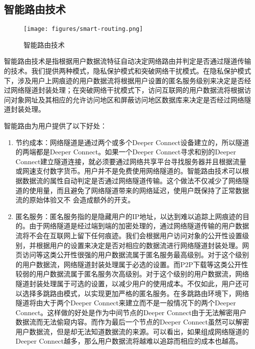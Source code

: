 \documentclass[a4paper]{article}
\begin{document}
\subsection{智能路由技术}

\begin{figure}[hhhh]
\centering
\texttt{[image: figures/smart-routing.png]}
\caption{智能路由技术}
\label{fig:smart-routing}
\end{figure}

智能路由技术是指根据用户数据流特征自动决定网络路由并判定是否通过隧道传输的技术。我们提供两种模式，隐私保护模式和突破网络干扰模式。在隐私保护模式下，涉及用户上网痕迹的用户数据流将根据用户设置的匿名服务级别来决定是否经过网络隧道封装处理；在突破网络干扰模式下，访问互联网的用户数据流将根据访问对象网址及其相应的允许访问地区和屏蔽访问地区数据库来决定是否经过网络隧道封装处理。

智能路由为用户提供了以下好处：
\begin{enumerate}
\item 节约成本：网络隧道是通过两个或多个Deeper Connect设备建立的，所以隧道的两端都是Deeper Connect。如果一个Deeper Connect寻求和别的Deeper Connect建立隧道连接，就必须要通过网络共享平台寻找服务器并且根据流量或网速支付数字货币。用户并不是免费使用网络隧道的。智能路由技术可以根据数据流的属性自动判定是否通过网络隧道传输。这个做法不仅减少了网络隧道的使用量，而且避免了网络隧道带来的网络延迟，使用户既保持了正常数据流的原始体验又不
会造成额外的开支。

\item 匿名服务：匿名服务指的是隐藏用户的IP地址，以达到难以追踪上网痕迹的目的。由于网络隧道是经过端到端的加密处理的，通过网络隧道传输的用户数据流将不会在互联网上留下任何痕迹。我们会根据用户访问对象的公开性设置级别，并根据用户的设置来决定是否对相应的数据流进行网络隧道封装处理。网页访问等这类公开性很强的用户数据流属于匿名服务最高级别。对于这个级别的用户数据流，网络隧道封装处理属于必选的设置。而P2P下载等这类公开性较弱的用户数据流属于匿名服务次高级别。对于这个级别的用户数据流，网络隧道封装处理属于可选的设置，以减少用户的使用成本。不仅如此，用户还可以选择多跳路由模式，以实现更加严格的匿名服务。在多跳路由环境下，网络隧道将由大于两个Deeper Connect来建立而不是一般情况下的两个Deeper Connect。这样做的好处是作为中间节点的Deeper Connect由于无法解密用户数据流而无法偷窥内容。而作为最后一个节点的Deeper Connect虽然可以解密用户数据流，但是却无法知道数据流的来源。可以看出，如果组成网络隧道的Deeper Connect越多，那么用户数据流将越难以追踪而相应的成本也越高。
\end{enumerate}
\end{document}
